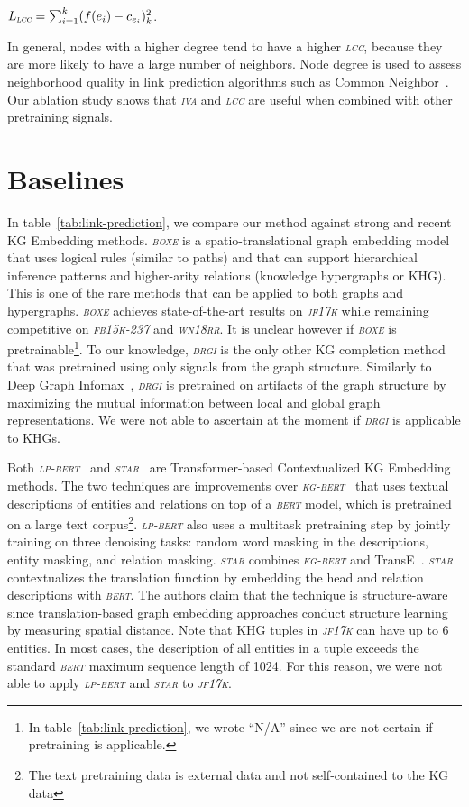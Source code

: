 \documentclass{article}
\newcommand{\starbert}{\textsl{\textsc{star}}\xspace}
\newcommand{\lpbert}{\textsl{\textsc{lp-bert}}\xspace}
\newcommand{\drgi}{\textsl{\textsc{drgi}}\xspace}
\newcommand{\boxe}{\textsl{\textsc{boxe}}\xspace}
\newcommand{\kgbert}{\textsl{\textsc{kg-bert}}\xspace}
\newcommand{\bert}{\textsl{\textsc{bert}}\xspace}
\newcommand{\wnrr}{\textsl{\textsc{wn18rr}}\xspace}
\newcommand{\fb}{\textsl{\textsc{fb15k-237}}\xspace}
\newcommand{\jf}{\textsl{\textsc{jf17k}}\xspace}
\newcommand{\lcc}{\textsl{\textsc{lcc}}\xspace}
\newcommand{\iva}{\textsl{\textsc{iva}}\xspace}
\begin{document}
$L_{\lcc} = \sum_{i=1}^k(f(e_i) - c_{e_i})_k^2$.

In general, nodes with a higher degree tend to have a higher \lcc, because they are more likely to have a large number of neighbors. 
Node degree is used to assess neighborhood quality in link prediction algorithms such as Common Neighbor~\cite{PhysRevE.64.025102}. 
Our ablation study shows that \iva and \lcc are useful when combined with other pretraining signals. 


\section{Baselines}
\label{app:baselines}

In table~\ref{tab:link-prediction}, we compare our method against strong and recent KG Embedding methods. 
\boxe \cite{boxe} is a spatio-translational graph embedding model that uses logical rules (similar to paths) and that can support hierarchical inference patterns and higher-arity relations (knowledge hypergraphs or KHG). 
This is one of the rare methods that can be applied to both graphs and hypergraphs. \boxe achieves state-of-the-art results on \jf while remaining competitive on \fb and \wnrr. 
It is unclear however if \boxe is pretrainable\footnote{In table~\ref{tab:link-prediction}, we wrote ``N/A'' since we are not certain if pretraining is applicable.}. 
To our knowledge, \drgi \cite{drgi2021} is the only other KG completion method that was pretrained using only signals from the graph structure. 
Similarly to Deep Graph Infomax~\cite{velickovic2018deep}, \drgi is pretrained on artifacts of the graph structure by maximizing the mutual information between local and global graph representations. 
We were not able to ascertain at the moment if \drgi is applicable to KHGs.

Both \lpbert~\cite{lpbert2022} and \starbert~\cite{star2021} are Transformer-based Contextualized KG Embedding methods.
The two techniques are improvements over \kgbert~\cite{Yao2019KGBERTBF} that uses textual descriptions of entities and relations on top of a \bert model, which is pretrained on a large text corpus\footnote{The text pretraining data is external data and not self-contained to the KG data}. 
\lpbert also uses a multitask pretraining step by jointly training on three denoising tasks: random word masking in the descriptions, entity masking, and relation masking. 
\starbert combines \kgbert and TransE~\cite{transe2013}. 
\starbert contextualizes the translation function by embedding the head and relation descriptions with \bert. 
The authors claim that the technique is structure-aware since translation-based graph embedding approaches conduct structure learning by measuring spatial distance.
Note that KHG tuples in \jf can have up to 6 entities.
In most cases, the description of all entities in a tuple exceeds the standard \bert maximum sequence length of 1024.
For this reason, we were not able to apply \lpbert and \starbert to \jf.
\end{document}

